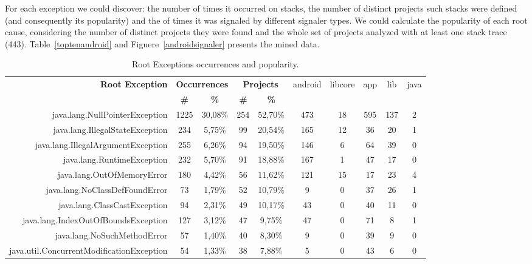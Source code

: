 \documentclass[conference]{IEEEtran}
\begin{document}
For each exception we could discover: the number of times it occurred on stacks, the number of distinct projects such stacks were defined (and consequently its popularity) and the of times it was signaled by different signaler types. We could calculate the popularity of each root cause, considering the number of distinct projects they were found and the whole set of projects analyzed with at least one stack trace (443). Table~\ref{toptenandroid} and Figuere~\ref{androidsignaler} presents the mined data.

\begin{table}
  \centering
  \begin{tabular}{rccccccccc}
    \hline
    \bfseries{Root Exception} &  \multicolumn{2}{c}{\bfseries{Occurrences}} &  \multicolumn{2}{c}{\bfseries{Projects}} & \textsf{android} & \textsf{libcore} & \textsf{app} & \textsf{lib} & \textsf{java} \\
    & \bfseries{\#} &  \bfseries{\%} & \bfseries{\# } & \bfseries{\% } &&&&&\\
    \hline
java.lang.NullPointerException	            & 1225  &   30,08\% &	254	&	52,70\%	&	473	&	18	&	595	&	137	&	2	\\
java.lang.IllegalStateException	            & 234	&   5,75\%  &	99	&	20,54\%	&	165	&	12	&	36	&	20	&	1	\\
java.lang.IllegalArgumentException	        & 255	&   6,26\%  &	94	&	19,50\%	&	146	&	6	&	64	&	39	&	0	\\
java.lang.RuntimeException	                & 232	&   5,70\%  &	91	&	18,88\%	&	167	&	1	&	47	&	17	&	0	\\
java.lang.OutOfMemoryError	                & 180	&   4,42\%  &   56	&	11,62\%	&	121	&	15	&	17	&	23	&	4	\\
java.lang.NoClassDefFoundError	            & 73	&   1,79\%  &	52	&	10,79\%	&	9	&	0	&	37	&	26	&	1	\\
java.lang.ClassCastException	            & 94	&   2,31\%  &	49	&	10,17\%	&	43	&	0	&	40	&	11	&	0	\\
java.lang.IndexOutOfBoundsException	        & 127	&   3,12\%  &	47	&	9,75\%	&	47	&	0	&	71	&	8	&	1	\\
java.lang.NoSuchMethodError	                & 57	&   1,40\%  &	40	&	8,30\%	&	9	&	0	&	39	&	9	&	0	\\
java.util.ConcurrentModificationException   & 54	&   1,33\%  &	38	&	7,88\%	&	5	&	0	&	43	&	6	&	0	\\

    \hline
  \end{tabular}
\caption{Root Exceptions occurrences and popularity.}
\label{tab:toptenandroid}
\end{table}
\end{document}
